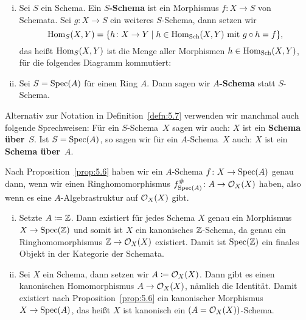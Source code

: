 \begin{defn}
\label{defn:5.7}
	\begin{enumerate}[i)]
		\item Sei $S$ ein Schema. Ein $S$\textbf{-Schema} ist ein Morphismus $f\colon X \to S$ von Schemata. Sei $g\colon X \to S$ ein weiteres $S$-Schema, dann setzen wir
		\[
			\operatorname{Hom}_{S}(X,Y)=\{h\colon X\to Y\mid h \in \operatorname{Hom}_{\operatorname{Sch}}(X,Y) \text{ mit } g \circ h = f\},
		\]
		das heißt $\operatorname{Hom}_{S}(X,Y)$ ist die Menge aller Morphismen $h \in \operatorname{Hom}_{\operatorname{Sch}}(X,Y)$, für die folgendes Diagramm kommutiert:
		\begin{center}
		\end{center}
		\item Sei $S=\operatorname{Spec}(A)$ für einen Ring $A$. Dann sagen wir $A$\textbf{-Schema} statt $S$-Schema.
	\end{enumerate}
\end{defn}

\begin{bem*}
    Alternativ zur Notation in Definition~\ref{defn:5.7} verwenden wir manchmal auch folgende Sprechweisen:
    Für ein $S$-Schema~$X$ sagen wir auch: $X$ ist ein \textbf{Schema über}~$S$. Ist $S=\operatorname{Spec}(A)$, so sagen
    wir für ein $A$-Schema~$X$ auch: $X$ ist ein \textbf{Schema über}~$A$.
\end{bem*}

\begin{bem*}
    Nach Proposition~\ref{prop:5.6} haben wir ein $A$-Schema $f \colon X \to \operatorname{Spec}(A)$ genau dann, wenn wir einen Ringhomomorphismus $f^{\#}_{\operatorname{Spec}(A)}\colon A \to \mathcal{O}_X(X)$ haben, also wenn es eine $A$-Alge\-brastruktur auf $\mathcal{O}_X(X)$ gibt.
\end{bem*}

\begin{bsp}
\label{bsp:5.8}
	\begin{enumerate}[i)]
		\item Setzte $A \coloneqq \mathbb {Z}$. Dann existiert für jedes Schema $X$ genau ein Morphismus $X \to \operatorname{Spec}(\mathbb {Z})$ und somit ist $X$ ein kanonisches $\mathbb {Z}$-Schema, da genau ein Ringhomomorphismus $\mathbb {Z} \to \mathcal{O}_X(X)$ existiert. Damit ist $\operatorname{Spec}(\mathbb {Z})$ ein finales Objekt in der Kategorie der Schemata.
		\item Sei $X$ ein Schema, dann setzen wir $A \coloneqq \mathcal{O}_X(X)$. Dann gibt es einen kanonischen Homomorphismus $A \to \mathcal{O}_X(X)$, nämlich die Identität. Damit existiert nach Proposition~\ref{prop:5.6} ein kanonischer Morphismus $X \to \operatorname{Spec}(A)$, das heißt $X$ ist kanonisch ein $(A=\mathcal{O}_X(X))$-Schema.
	\end{enumerate}
\end{bsp}

